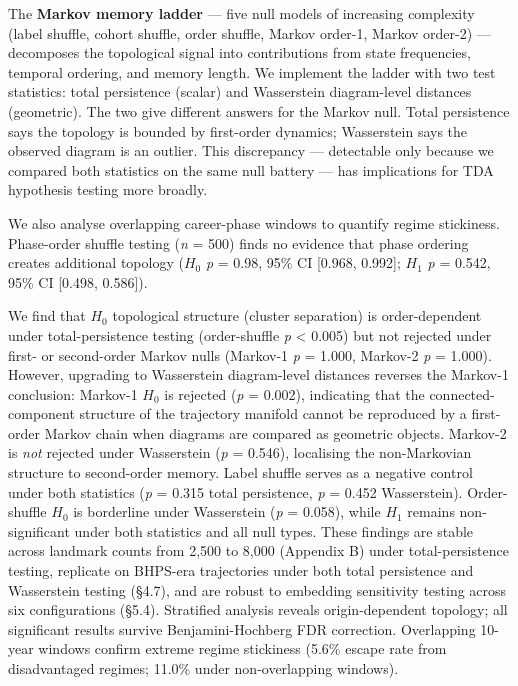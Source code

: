 The \textbf{Markov memory ladder} --- five null models of increasing complexity (label shuffle, cohort shuffle, order shuffle, Markov order-1, Markov order-2) --- decomposes the topological signal into contributions from state frequencies, temporal ordering, and memory length. We implement the ladder with two test statistics: total persistence (scalar) and Wasserstein diagram-level distances (geometric). The two give different answers for the Markov null. Total persistence says the topology is bounded by first-order dynamics; Wasserstein says the observed diagram is an outlier. This discrepancy --- detectable only because we compared both statistics on the same null battery --- has implications for TDA hypothesis testing more broadly.

We also analyse overlapping career-phase windows to quantify regime stickiness. Phase-order shuffle testing (\textit{n} = 500) finds no evidence that phase ordering creates additional topology ($H_0$ \textit{p} = 0.98, 95\% CI [0.968, 0.992]; $H_1$ \textit{p} = 0.542, 95\% CI [0.498, 0.586]).

We find that $H_0$ topological structure (cluster separation) is order-dependent under total-persistence testing (order-shuffle \textit{p} < 0.005) but not rejected under first- or second-order Markov nulls (Markov-1 \textit{p} = 1.000, Markov-2 \textit{p} = 1.000). However, upgrading to Wasserstein diagram-level distances reverses the Markov-1 conclusion: Markov-1 $H_0$ is rejected (\textit{p} = 0.002), indicating that the connected-component structure of the trajectory manifold cannot be reproduced by a first-order Markov chain when diagrams are compared as geometric objects. Markov-2 is \textit{not} rejected under Wasserstein (\textit{p} = 0.546), localising the non-Markovian structure to second-order memory. Label shuffle serves as a negative control under both statistics (\textit{p} = 0.315 total persistence, \textit{p} = 0.452 Wasserstein). Order-shuffle $H_0$ is borderline under Wasserstein (\textit{p} = 0.058), while $H_1$ remains non-significant under both statistics and all null types. These findings are stable across landmark counts from 2,500 to 8,000 (Appendix B) under total-persistence testing, replicate on BHPS-era trajectories under both total persistence and Wasserstein testing (\S4.7), and are robust to embedding sensitivity testing across six configurations (\S5.4). Stratified analysis reveals origin-dependent topology; all significant results survive Benjamini-Hochberg FDR correction. Overlapping 10-year windows confirm extreme regime stickiness (5.6\% escape rate from disadvantaged regimes; 11.0\% under non-overlapping windows).


